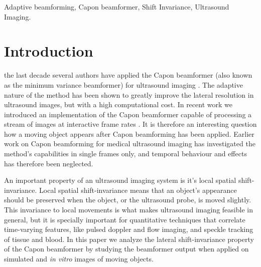 \documentclass[journal]{IEEEtran}
\begin{document}
\begin{IEEEkeywords}
Adaptive beamforming, Capon beamformer, Shift Invariance, Ultrasound Imaging.
\end{IEEEkeywords}






%
\IEEEpeerreviewmaketitle



\section{Introduction}
% 
% 
% 
% 

 the last decade several authors have applied the Capon beamformer (also known as the minimum variance beamformer) for ultrasound imaging \cite{Synnevag2007, Vignon2008, Viola}. The adaptive nature of the method has been shown to greatly improve the lateral resolution in ultrasound images, but with a high computational cost. In recent work we introduced an implementation of the Capon beamformer capable of processing a stream of images at interactive frame rates \cite{Asen}. It is therefore an interesting question how a moving object appears after Capon beamforming has been applied. Earlier work on Capon beamforming for medical ultrasound imaging has investigated the method's capabilities in single frames only, and temporal behaviour and effects has therefore been neglected. 

An important property of an ultrasound imaging system is it's local spatial shift-invariance. Local spatial shift-invariance means that an object's appearance should be preserved when the object, or the ultrasound probe, is moved slightly. This invariance to local movements is what makes ultrasound imaging feasible in general, but it is specially important for quantitative techniques that correlate time-varying features, like pulsed doppler and flow imaging, and speckle tracking of tissue and blood. In this paper we analyze the lateral shift-invariance property of the Capon beamformer by studying the beamformer output when applied on simulated and \textit{in vitro} images of moving objects.
\end{document}
